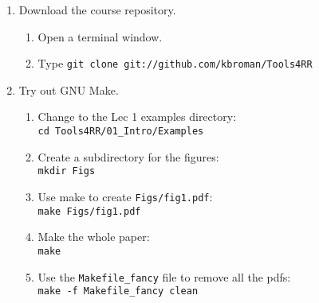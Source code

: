 \documentclass[12pt]{article}
\newcommand{\ttsm}{\tt \small}
\begin{document}
\begin{enumerate}
\begin{enumerate}
  \end{enumerate}

\item Download the course repository.

  \begin{enumerate}
  \item Open a terminal window.
  \item Type {\ttsm git clone git://github.com/kbroman/Tools4RR}
  \end{enumerate}

\item Try out GNU Make.

  \begin{enumerate}
  \item Change to the Lec 1 examples directory: \\
    {\ttsm cd Tools4RR/01\_Intro/Examples}
  \item Create a subdirectory for the figures: \\
    {\ttsm mkdir Figs}
  \item Use make to create {\ttsm Figs/fig1.pdf}: \\
    {\ttsm make Figs/fig1.pdf}
  \item Make the whole paper:\\
    {\ttsm make}
  \item Use the {\ttsm Makefile\_fancy} file to remove all the
    pdfs:\\
    {\ttsm make -f Makefile\_fancy clean}
  \end{enumerate}

\end{enumerate}
\end{document}
